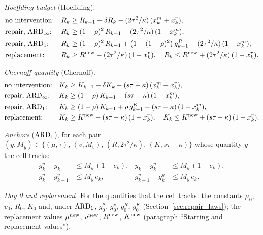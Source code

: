 \emph{Hoeffding budget} (Hoeffding).
\begin{align}
  &\text{no intervention:} & R_k &\geq R_{k-1} + \delta R_k
    - (2\tau^2/\kappa)\,(x^m_k + x^r_k),
    \label{eq:rf_R_carry} \\
  &\text{repair, } \mathrm{ARD}_{\infty}\text{:} & R_k &\geq (1-\rho)^2\, R_{k-1}
    - (2\tau^2/\kappa)\,(1 - x^m_k),
    \label{eq:rf_R_inf} \\
  &\text{repair, } \mathrm{ARD}_{1}\text{:} & R_k &\geq (1-\rho)^2\, R_{k-1}
    + \bigl(1 - (1-\rho)^2\bigr)\, g^{R}_{k-1} - (2\tau^2/\kappa)\,(1 - x^m_k),
    \label{eq:rf_R_one} \\
  &\text{replacement:} & R_k &\geq R^{\mathrm{new}} - (2\tau^2/\kappa)\,(1 - x^r_k), \quad
    R_k \leq R^{\mathrm{new}} + (2\tau^2/\kappa)\,(1 - x^r_k).
    \label{eq:rf_R_repl}
\end{align}

\emph{Chernoff quantity} (Chernoff).
\begin{align}
  &\text{no intervention:} & K_k &\geq K_{k-1} + \delta K_k
    - (s\tau - \kappa)\,(x^m_k + x^r_k),
    \label{eq:rf_K_carry} \\
  &\text{repair, } \mathrm{ARD}_{\infty}\text{:} & K_k &\geq (1-\rho)\, K_{k-1}
    - (s\tau - \kappa)\,(1 - x^m_k),
    \label{eq:rf_K_inf} \\
  &\text{repair, } \mathrm{ARD}_{1}\text{:} & K_k &\geq (1-\rho)\, K_{k-1} + \rho\, g^{K}_{k-1}
    - (s\tau - \kappa)\,(1 - x^m_k),
    \label{eq:rf_K_one} \\
  &\text{replacement:} & K_k &\geq K^{\mathrm{new}} - (s\tau - \kappa)\,(1 - x^r_k), \quad
    K_k \leq K^{\mathrm{new}} + (s\tau - \kappa)\,(1 - x^r_k).
    \label{eq:rf_K_repl}
\end{align}

\emph{Anchors} ($\mathrm{ARD}_{1}$), for each pair
$(y, M_y) \in \{(\mu, \tau),\, (v, M_v),\, (R, 2\tau^2/\kappa),\, (K, s\tau - \kappa)\}$
whose quantity $y$ the cell tracks:
\begin{align}
  g^{y}_k - y_k &\leq M_y\,(1 - e_k), & y_k - g^{y}_k &\leq M_y\,(1 - e_k),
    \label{eq:rf_anchor_set} \\
  g^{y}_k - g^{y}_{k-1} &\leq M_y\, e_k, & g^{y}_{k-1} - g^{y}_k &\leq M_y\, e_k.
    \label{eq:rf_anchor_keep}
\end{align}

\emph{Day 0 and replacement.} For the quantities that the cell tracks: the constants
$\mu_0$, $v_0$, $R_0$, $K_0$ and, under $\mathrm{ARD}_{1}$, $g^{\mu}_0$, $g^{v}_0$, $g^{R}_0$,
$g^{K}_0$ (Section~\ref{sec:repair_laws}); the replacement values $\mu^{\mathrm{new}}$,
$v^{\mathrm{new}}$, $R^{\mathrm{new}}$, $K^{\mathrm{new}}$ (paragraph ``Starting and replacement values'').

